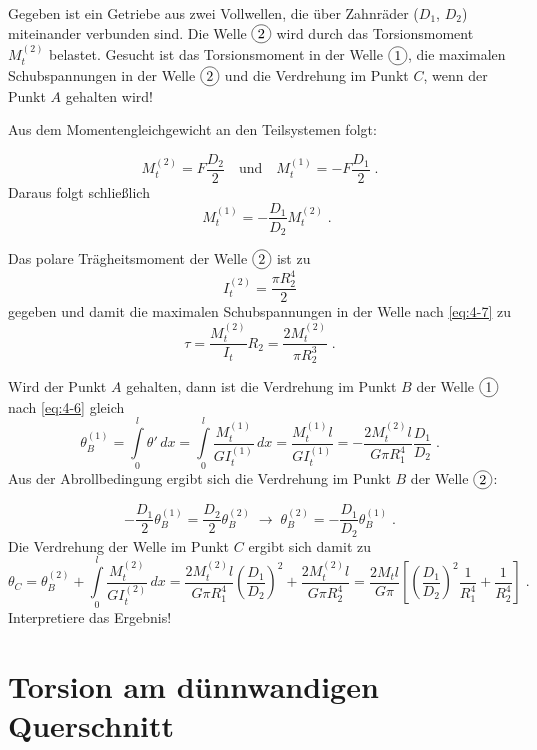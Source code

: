\begin{example}
%
Gegeben ist ein Getriebe  aus zwei Vollwellen, die über Zahnräder ($D_1$, $D_2$) miteinander verbunden sind.
Die Welle $\circled{$2$}$ wird durch das Torsionsmoment $M_t^{(2)}$ belastet.
Gesucht ist das Torsionsmoment in der Welle $\circled{$1$}$, die maximalen Schubspannungen in der Welle $\circled{$2$}$ und die Verdrehung im Punkt $C$, wenn der Punkt $A$ gehalten wird!
%
\begin{center}
	
\end{center}
%

Aus dem Momentengleichgewicht an den Teilsystemen folgt:
%
\begin{center}
	
\end{center}
%
\[ 
M_t^{(2)}=F\dfrac{D_2}{2} \quad \text{und} \quad M_t^{(1)}=-F\dfrac{D_1}{2} \; .
\]
%
Daraus folgt schließlich
%
\[
\quad M_t^{(1)} = -\dfrac{D_1}{D_2}M_t^{(2)} \; .
\]
%

Das polare Trägheitsmoment der Welle $\circled{$2$}$ ist zu
\[
I_t^{(2)} = \dfrac{\pi R_2^4}{2} 
\]
gegeben und damit die maximalen Schubspannungen in der Welle nach \eqref{eq:4-7} zu
\[
\tau = \dfrac{M_t^{(2)}}{I_t}R_2 = \dfrac{2M_t^{(2)}}{\pi R_2^3} \; .
\]

Wird der Punkt $A$ gehalten, dann ist die Verdrehung im Punkt $B$ der Welle $\circled{1}$ nach \eqref{eq:4-6} gleich
%
\[
\theta_B^{(1)} = \int\limits_0^l\theta'\,dx = \int\limits_0^l\dfrac{M_t^{(1)}}{GI_t^{(1)}}\,dx = \dfrac{M_t^{(1)}l}{GI_t^{(1)}}=-\dfrac{2M_t^{(2)}l}{G\pi R_1^4}\dfrac{D_1}{D_2} \; .
\]
% 
Aus der Abrollbedingung ergibt sich die Verdrehung im Punkt $B$ der Welle $\circled{$2$}$:
%
\begin{center}
	
\end{center} 
%
\[
-\dfrac{D_1}{2}\theta_B^{(1)} = \dfrac{D_2}{2}\theta_B^{(2)} \; \rightarrow \; \theta_B^{(2)} = -\dfrac{D_1}{D_2}\theta_B^{(1)} \; .
\]
%
Die Verdrehung der Welle im Punkt $C$ ergibt sich damit zu
%
\[
\theta_C=\theta_B^{(2)} + \int\limits_0^l\dfrac{M_t^{(2)}}{GI_t^{(2)}}\,dx = \dfrac{2M_t^{(2)}l}{G\pi R_1^4}\left(\dfrac{D_1}{D_2}\right)^2 + \dfrac{2M_t^{(2)}l}{G\pi R_2^4} =
\dfrac{2M_tl}{G\pi}\left[\left(\dfrac{D_1}{D_2}\right)^2\dfrac{1}{R_1^4}+\dfrac{1}{R_2^4}\right] \; .
\]
%
Interpretiere das Ergebnis!
%
\end{example}



\section{Torsion am dünnwandigen Querschnitt}

